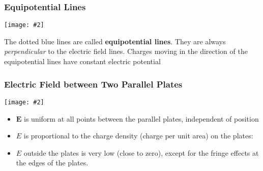\documentclass[12pt,aspectratio=169]{beamer}
\newcommand{\pic}[2]{\texttt{[image: \#2]}}
\newcommand{\mb}[1]{\mathbf{#1}}
\begin{document}
%
%
\begin{frame}
  \frametitle{Equipotential Lines}
  \begin{center}
    \pic{0.65}{plate3.png}
  \end{center}

  \vspace{-.2in}The dotted blue lines are called \textbf{equipotential lines}.
  They are always \emph{perpendicular} to the electric field lines. Charges
  moving in the direction of the equipotential lines have constant electric
  potential
\end{frame}

\begin{frame}
  \frametitle{Electric Field between Two Parallel Plates}
  \begin{center}
    \pic{.6}{elfield-600x205.jpg}
  \end{center}
  
  \vspace{-.2in}
  \begin{itemize}
  \item $\mb{E}$ is uniform at all points between the
    parallel plates, independent of position
  \item $E$ is proportional to the charge density (charge per unit
    area) on the plates:

  \item $E$ outside the plates is very low (close to zero), except for
    the fringe effects at the edges of the plates. 
  \end{itemize}
\end{frame}
\end{document}

